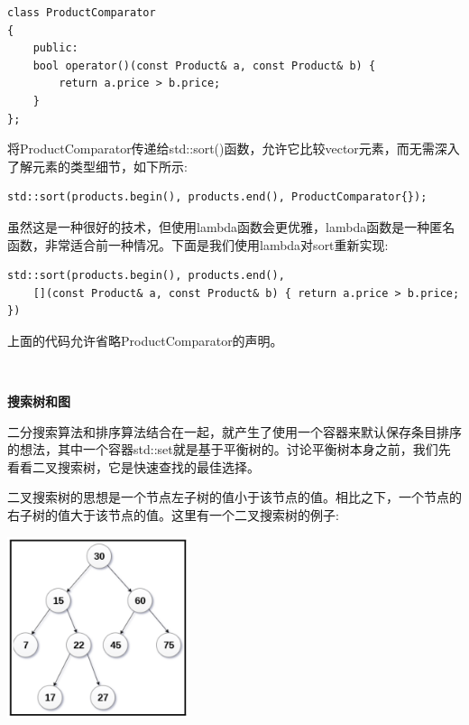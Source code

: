 \begin{lstlisting}[caption={}]
class ProductComparator
{
	public:
	bool operator()(const Product& a, const Product& b) {
		return a.price > b.price;
	}
};
\end{lstlisting}

将ProductComparator传递给std::sort()函数，允许它比较vector元素，而无需深入了解元素的类型细节，如下所示: \par

\begin{lstlisting}[caption={}]
std::sort(products.begin(), products.end(), ProductComparator{});
\end{lstlisting}

虽然这是一种很好的技术，但使用lambda函数会更优雅，lambda函数是一种匿名函数，非常适合前一种情况。下面是我们使用lambda对sort重新实现: \par

\begin{lstlisting}[caption={}]
std::sort(products.begin(), products.end(),
	[](const Product& a, const Product& b) { return a.price > b.price; })
\end{lstlisting}

上面的代码允许省略ProductComparator的声明。 \par

\noindent\textbf{}\ \par
\textbf{搜索树和图} \ \par
二分搜索算法和排序算法结合在一起，就产生了使用一个容器来默认保存条目排序的想法，其中一个容器std::set就是基于平衡树的。讨论平衡树本身之前，我们先看看二叉搜索树，它是快速查找的最佳选择。 \par
二叉搜索树的思想是一个节点左子树的值小于该节点的值。相比之下，一个节点的右子树的值大于该节点的值。这里有一个二叉搜索树的例子: \par

\begin{center}
	\includegraphics[width=0.4\textwidth]{content/Section-2/Chapter-6/24}
\end{center}

